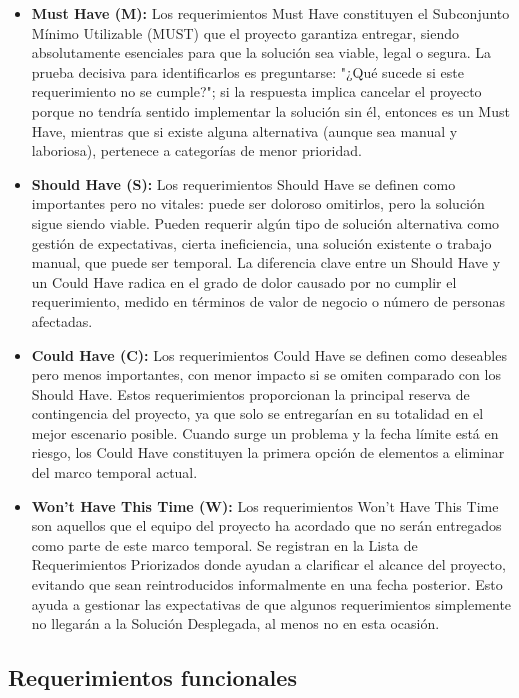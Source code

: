 \begin{itemize}
	\item \textbf{Must Have (M):} Los requerimientos Must Have constituyen el Subconjunto Mínimo Utilizable (MUST) que el proyecto garantiza entregar, siendo absolutamente esenciales para que la solución sea viable, legal o segura. La prueba decisiva para identificarlos es preguntarse: "¿Qué sucede si este requerimiento no se cumple?"; si la respuesta implica cancelar el proyecto porque no tendría sentido implementar la solución sin él, entonces es un Must Have, mientras que si existe alguna alternativa (aunque sea manual y laboriosa), pertenece a categorías de menor prioridad.
	\item \textbf{Should Have (S):} Los requerimientos Should Have se definen como importantes pero no vitales: puede ser doloroso omitirlos, pero la solución sigue siendo viable. Pueden requerir algún tipo de solución alternativa como gestión de expectativas, cierta ineficiencia, una solución existente o trabajo manual, que puede ser temporal. La diferencia clave entre un Should Have y un Could Have radica en el grado de dolor causado por no cumplir el requerimiento, medido en términos de valor de negocio o número de personas afectadas.
	\item \textbf{Could Have (C):} Los requerimientos Could Have se definen como deseables pero menos importantes, con menor impacto si se omiten comparado con los Should Have. Estos requerimientos proporcionan la principal reserva de contingencia del proyecto, ya que solo se entregarían en su totalidad en el mejor escenario posible. Cuando surge un problema y la fecha límite está en riesgo, los Could Have constituyen la primera opción de elementos a eliminar del marco temporal actual.
	\item \textbf{Won't Have This Time (W):} Los requerimientos Won't Have This Time son aquellos que el equipo del proyecto ha acordado que no serán entregados como parte de este marco temporal. Se registran en la Lista de Requerimientos Priorizados donde ayudan a clarificar el alcance del proyecto, evitando que sean reintroducidos informalmente en una fecha posterior. Esto ayuda a gestionar las expectativas de que algunos requerimientos simplemente no llegarán a la Solución Desplegada, al menos no en esta ocasión.
\end{itemize}



\subsection*{Requerimientos funcionales}

